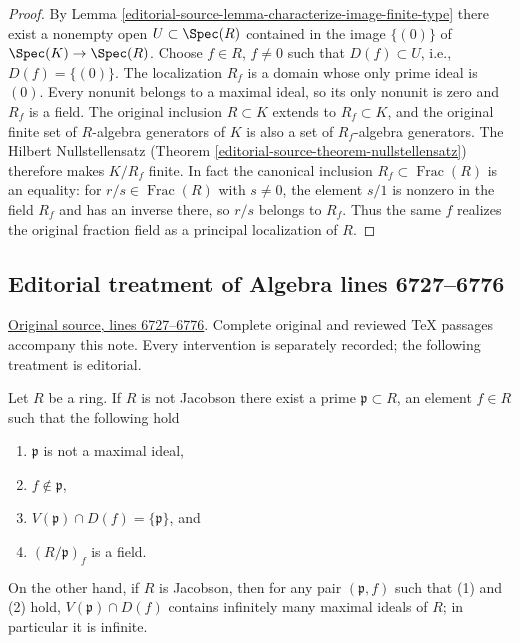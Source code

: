 \begin{proof}
By Lemma \ref{editorial-source-lemma-characterize-image-finite-type} there
exist a nonempty open $U \subset \Spec(R)$
contained in the image $\{(0)\}$ of $\Spec(K) \to \Spec(R)$.
Choose $f \in R$, $f \not = 0$ such that $D(f) \subset U$, i.e.,
$D(f)=\{(0)\}$. The localization $R_f$ is a domain whose only
prime ideal is $(0)$. Every nonunit belongs to a maximal ideal,
so its only nonunit is zero and $R_f$ is a field. The original
inclusion $R\subset K$ extends to $R_f\subset K$, and the original
finite set of $R$-algebra generators of $K$ is also a set of
$R_f$-algebra generators. The Hilbert Nullstellensatz
(Theorem \ref{editorial-source-theorem-nullstellensatz}) therefore makes $K/R_f$ finite.
In fact the canonical inclusion $R_f\subset\operatorname{Frac}(R)$
is an equality: for $r/s\in\operatorname{Frac}(R)$ with $s\ne0$,
the element $s/1$ is nonzero in the field $R_f$ and has an inverse
there, so $r/s$ belongs to $R_f$. Thus the same $f$ realizes the
original fraction field as a principal localization of $R$.
\end{proof}


\subsection{Editorial treatment of Algebra lines 6727--6776}

\hypertarget{algebra-context-056}{}

\noindent\href{https://github.com/stacks/stacks-project/blob/a04446e57ec1fbc252a871afcec7752fb2807b14/algebra.tex\#L6727}{Original source, lines 6727--6776}. Complete original and reviewed TeX passages accompany this note. Every intervention is separately recorded; the following treatment is editorial.


\begin{lemma}
\label{editorial-source-lemma-characterize-jacobson}
Let $R$ be a ring. If $R$ is not Jacobson there exist
a prime $\mathfrak p \subset R$, an element $f \in R$
such that the following hold
\begin{enumerate}
\item $\mathfrak p$ is not a maximal ideal,
\item $f \not \in \mathfrak p$,
\item $V(\mathfrak p) \cap D(f) = \{\mathfrak p\}$, and
\item $(R/\mathfrak p)_f$ is a field.
\end{enumerate}
On the other hand, if $R$ is Jacobson, then for any pair $(\mathfrak p, f)$
such that (1) and (2) hold, $V(\mathfrak p)\cap D(f)$ contains
infinitely many maximal ideals of $R$; in particular it is infinite.
\end{lemma}

